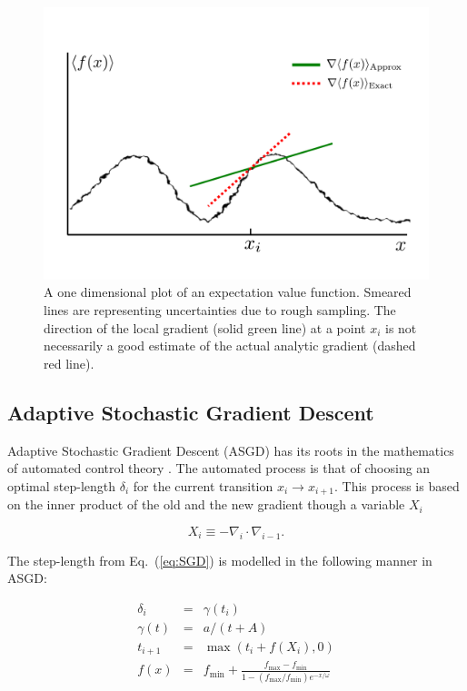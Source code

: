 \begin{figure}
 \begin{center}
  \includegraphics[scale=0.3]{../Graphics/SSGD.pdf}
  \caption{A one dimensional plot of an expectation value function. Smeared lines are representing uncertainties due to rough sampling. The direction of the local gradient (solid green line) at a point $x_i$ is not necessarily a good estimate of the actual analytic gradient (dashed red line).}
  \label{fig:sSGD}
 \end{center}
\end{figure}


\subsection{Adaptive Stochastic Gradient Descent}

Adaptive Stochastic Gradient Descent (ASGD) has its roots in the mathematics of automated control theory \cite{ASGD_MB}. The automated process is that of choosing an optimal step-length $\delta_i$ for the current transition $x_{i}\to x_{i+1}$. This process is based on the inner product of the old and the new gradient though a variable $X_i$

\begin{equation}
\label{eq:ASGD_X_i}
 X_i \equiv -\nabla_i\cdot \nabla_{i-1}.
\end{equation}

The step-length from Eq.~(\ref{eq:SGD}) is modelled in the following manner in ASGD:

\begin{eqnarray}
 \delta_i   &=& \gamma(t_i) \\
 \gamma(t)  &=& a/(t + A) \label{eq:ASGD_delta_i}\\
 t_{i+1}    &=& \max(t_i + f(X_i), 0) \label{eq:ASGD_t_i}\\
 f(x)       &=& f_\mathrm{min} + \frac{f_\mathrm{max} - f_\mathrm{min}}{1 - (f_\mathrm{max}/f_\mathrm{min})e^{-x/\omega}}\label{eq:ASGD_f_i}
\end{eqnarray}

